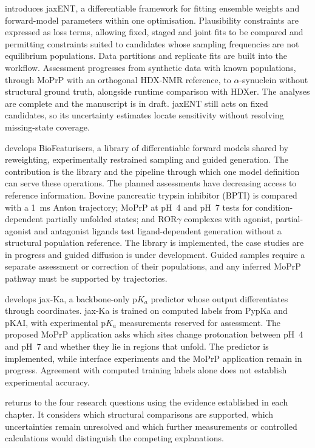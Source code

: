  introduces jaxENT, a differentiable framework for fitting ensemble weights and forward-model parameters within one optimisation. Plausibility constraints are expressed as loss terms, allowing fixed, staged and joint fits to be compared and permitting constraints suited to candidates whose sampling frequencies are not equilibrium populations. Data partitions and replicate fits are built into the workflow. Assessment progresses from synthetic data with known populations, through MoPrP with an orthogonal HDX-NMR reference, to $\alpha$-synuclein without structural ground truth, alongside runtime comparison with HDXer. The analyses are complete and the manuscript is in draft. jaxENT still acts on fixed candidates, so its uncertainty estimates locate sensitivity without resolving missing-state coverage.

 develops BioFeaturisers, a library of differentiable forward models shared by reweighting, experimentally restrained sampling and guided generation. The contribution is the library and the pipeline through which one model definition can serve these operations. The planned assessments have decreasing access to reference information. Bovine pancreatic trypsin inhibitor (BPTI) is compared with a 1~ms Anton trajectory; MoPrP at pH~4 and pH~7 tests for condition-dependent partially unfolded states; and ROR$\gamma$ complexes with agonist, partial-agonist and antagonist ligands test ligand-dependent generation without a structural population reference. The library is implemented, the case studies are in progress and guided diffusion is under development. Guided samples require a separate assessment or correction of their populations, and any inferred MoPrP pathway must be supported by trajectories.

 develops jax-Ka, a backbone-only p$K_a$ predictor whose output differentiates through coordinates. jax-Ka is trained on computed labels from PypKa and pKAI, with experimental p$K_a$ measurements reserved for assessment. The proposed MoPrP application asks which sites change protonation between pH~4 and pH~7 and whether they lie in regions that unfold. The predictor is implemented, while interface experiments and the MoPrP application remain in progress. Agreement with computed training labels alone does not establish experimental accuracy.

 returns to the four research questions using the evidence established in each chapter. It considers which structural comparisons are supported, which uncertainties remain unresolved and which further measurements or controlled calculations would distinguish the competing explanations.
